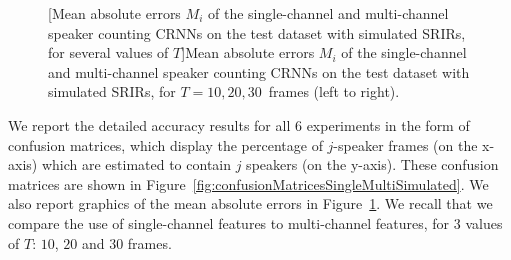 \begin{figure}[t]
    
    [Mean absolute errors $M_i$ of the single-channel and multi-channel speaker counting CRNNs on the test dataset with simulated SRIRs, for several values of $T$]{Mean absolute errors $M_i$ of the single-channel and multi-channel speaker counting CRNNs on the test dataset with simulated SRIRs, for $T = 10, 20, 30$~frames (left to right).}
    \label{fig:maeSingleMultiSimulated}
\end{figure}


We report the detailed accuracy results for all $6$ experiments in the form of confusion matrices, which display the percentage of $j$-speaker frames (on the x-axis) which are estimated to contain $j$ speakers (on the y-axis). These confusion matrices are shown in Figure~\ref{fig:confusionMatricesSingleMultiSimulated}. We also report graphics of the mean absolute errors in Figure~\ref{fig:maeSingleMultiSimulated}. We recall that we compare the use of single-channel features to multi-channel features, for $3$ values of $T$: $10$, $20$ and $30$ frames.

